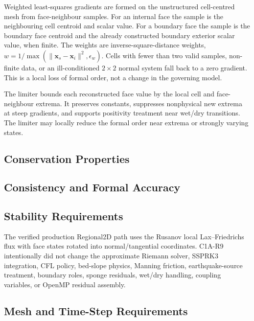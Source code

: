 Weighted least-squares gradients are formed on the unstructured
cell-centred mesh from face-neighbour samples. For an internal face the
sample is the neighbouring cell centroid and scalar value. For a
boundary face the sample is the boundary face centroid and the already
constructed boundary exterior scalar value, when finite. The weights are
inverse-square-distance weights,
$w=1/\max(\|\mathbf{x}_s-\mathbf{x}_i\|^2,\epsilon_w)$. Cells with
fewer than two valid samples, non-finite data, or an ill-conditioned
$2\times2$ normal system fall back to a zero gradient. This is a local
loss of formal order, not a change in the governing model.

The limiter bounds each reconstructed face value by the local cell and
face-neighbour extrema. It preserves constants, suppresses nonphysical
new extrema at steep gradients, and supports positivity treatment near
wet/dry transitions. The limiter may locally reduce the formal order
near extrema or strongly varying states.

\subsection{Conservation Properties}
\label{sec:res-num-flx-conservation-properties}


\subsection{Consistency and Formal Accuracy}
\label{sec:res-num-flx-consistency-formal-accuracy}


\subsection{Stability Requirements}
\label{sec:res-num-flx-stability-requirements}

The verified production Regional2D path uses the Rusanov local
Lax--Friedrichs flux with face states rotated into normal/tangential
coordinates. C1A-R9 intentionally did not change the approximate Riemann
solver, SSPRK3 integration, CFL policy, bed-slope physics, Manning
friction, earthquake-source treatment, boundary roles, sponge residuals,
wet/dry handling, coupling variables, or OpenMP residual assembly.

\subsection{Mesh and Time-Step Requirements}
\label{sec:res-num-flx-mesh-time-step-requirements}


